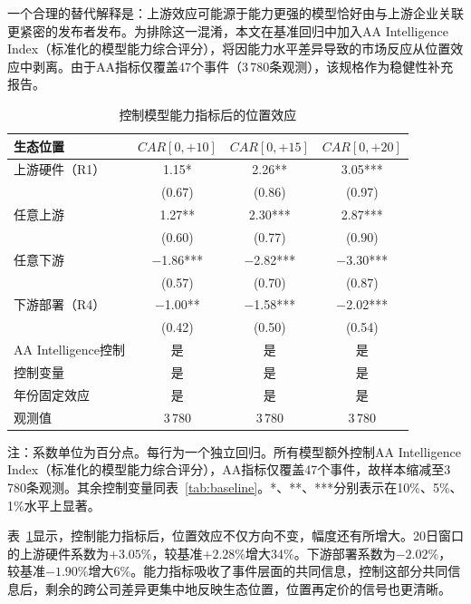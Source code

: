 \documentclass[11pt,fontset=fandol,a4paper]{ctexart}
\newcommand{\changed}[1]{{\color{orange!85!black}#1}}
\begin{document}
一个合理的替代解释是：上游效应可能源于能力更强的模型恰好由与上游企业关联更紧密的发布者发布。为排除这一混淆，本文在基准回归中加入AA Intelligence Index（标准化的模型能力综合评分），将因能力水平差异导致的市场反应从位置效应中剥离。由于AA指标仅覆盖47个事件（3\,780条观测），该规格作为稳健性补充报告。

\begin{table}[H]
\centering
\small
\begin{threeparttable}
\caption{控制模型能力指标后的位置效应}
\label{tab:aa_control}
\begin{tabular}{lccc}
\toprule
生态位置 & $CAR[0,+10]$ & $CAR[0,+15]$ & $CAR[0,+20]$ \\
\midrule
上游硬件（R1） & 1.15* & 2.26** & 3.05*** \\
 & (0.67) & (0.86) & (0.97) \\[3pt]
任意上游 & 1.27** & 2.30*** & 2.87*** \\
 & (0.60) & (0.77) & (0.90) \\[3pt]
任意下游 & $-$1.86*** & $-$2.82*** & $-$3.30*** \\
 & (0.57) & (0.70) & (0.87) \\[3pt]
下游部署（R4） & $-$1.00** & $-$1.58*** & $-$2.02*** \\
 & (0.42) & (0.50) & (0.54) \\
\midrule
AA Intelligence控制 & 是 & 是 & 是 \\
控制变量 & 是 & 是 & 是 \\
年份固定效应 & 是 & 是 & 是 \\
观测值 & 3\,780 & 3\,780 & 3\,780 \\
\bottomrule
\end{tabular}
\begin{tablenotes}
\footnotesize
\item 注：系数单位为百分点。每行为一个独立回归。所有模型额外控制AA Intelligence Index（标准化的模型能力综合评分），AA指标仅覆盖47个事件，故样本缩减至3\,780条观测。其余控制变量同表~\ref{tab:baseline}。*、**、***分别表示在10\%、5\%、1\%水平上显著。
\end{tablenotes}
\end{threeparttable}
\end{table}

\changed{表~\ref{tab:aa_control}显示，控制能力指标后，位置效应不仅方向不变，幅度还有所增大。20日窗口的上游硬件系数为$+3.05\%$，较基准$+2.28\%$增大34\%。下游部署系数为$-2.02\%$，较基准$-1.90\%$增大6\%。能力指标吸收了事件层面的共同信息，控制这部分共同信息后，剩余的跨公司差异更集中地反映生态位置，位置再定价的信号也更清晰。}
\end{document}
